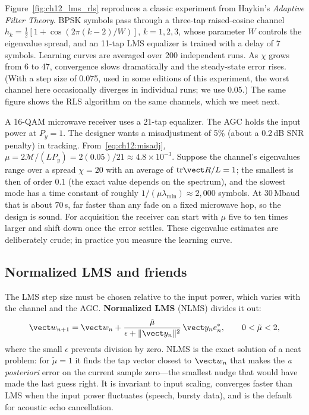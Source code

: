 Figure~\ref{fig:ch12_lms_rls} reproduces a classic experiment from Haykin's \emph{Adaptive Filter
Theory}. BPSK symbols pass through a three-tap raised-cosine channel
$h_k=\tfrac12[1+\cos(2\pi(k-2)/W)]$, $k=1,2,3$, whose parameter $W$ controls the eigenvalue spread,
and an 11-tap LMS equalizer is trained with a delay of 7 symbols. Learning curves are averaged over
200 independent runs. As $\chi$ grows from 6 to 47, convergence slows dramatically and the
steady-state error rises. (With a step size of 0.075, used in some editions of this experiment, the
worst channel here occasionally diverges in individual runs; we use 0.05.) The same figure shows
the RLS algorithm on the same channels, which we meet next.

\begin{worked}
A 16-QAM microwave receiver uses a 21-tap equalizer. The AGC holds the input power at $P_y=1$. The
designer wants a misadjustment of 5\% (about a 0.2\,dB SNR penalty) in tracking.
From~\eqref{eq:ch12:misadj}, $\mu=2\mathcal M/(LP_y)=2(0.05)/21\approx4.8\times10^{-3}$. Suppose the
channel's eigenvalues range over a spread $\chi=20$ with an average of $\mathrm{tr}\vect R/L=1$; the smallest
is then of order $0.1$ (the exact value depends on the spectrum), and the slowest mode has a time
constant of roughly $1/(\mu\lambda_{\min})\approx2{,}000$ symbols. At 30\,Mbaud that is about
70\,\textmu s, far faster than any fade on a fixed microwave hop, so the design is sound. For
acquisition the receiver can start with $\mu$ five to ten times larger and shift down once the error
settles. These eigenvalue estimates are deliberately crude; in practice you measure the learning curve.
\end{worked}

\subsection{Normalized LMS and friends}

The LMS step size must be chosen relative to the input power, which varies with the channel and the
AGC. \textbf{Normalized LMS} (NLMS) divides it out:
\begin{equation}
\vect w_{n+1}=\vect w_n+\frac{\tilde\mu}{\epsilon+\|\vect y_n\|^2}\,\vect y_n e_n^*,\qquad 0<\tilde\mu<2,
\label{eq:ch12:nlms}
\end{equation}
where the small $\epsilon$ prevents division by zero. NLMS is the exact solution of a neat problem:
for $\tilde\mu=1$ it finds the tap vector closest to $\vect w_n$ that makes the \emph{a posteriori}
error on the current sample zero---the smallest nudge that would have made the last guess right. It
is invariant to input scaling, converges faster than LMS when the input power fluctuates (speech,
bursty data), and is the default for acoustic echo cancellation.

